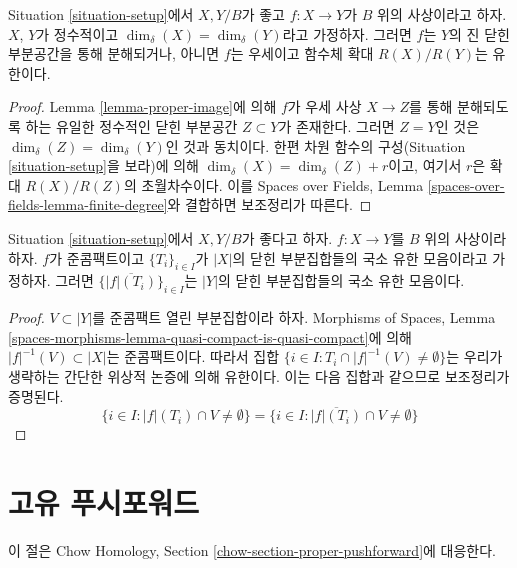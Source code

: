 \begin{lemma}
\label{lemma-equal-dimension}
Situation \ref{situation-setup}에서 $X, Y/B$가 좋고 $f : X \to Y$가
$B$ 위의 사상이라고 하자. $X$, $Y$가 정수적이고
$\dim_\delta(X) = \dim_\delta(Y)$라고 가정하자. 그러면 $f$는 $Y$의
진 닫힌 부분공간을 통해 분해되거나, 아니면 $f$는 우세이고 함수체 확대
$R(X) / R(Y)$는 유한이다.
\end{lemma}

\begin{proof}
Lemma \ref{lemma-proper-image}에 의해 $f$가 우세 사상 $X \to Z$를 통해
분해되도록 하는 유일한 정수적인 닫힌 부분공간 $Z \subset Y$가 존재한다.
그러면 $Z = Y$인 것은 $\dim_\delta(Z) = \dim_\delta(Y)$인 것과 동치이다.
한편 차원 함수의 구성(Situation \ref{situation-setup}을 보라)에 의해
$\dim_\delta(X) = \dim_\delta(Z) + r$이고, 여기서 $r$은 확대
$R(X)/R(Z)$의 초월차수이다. 이를 Spaces over Fields, Lemma
\ref{spaces-over-fields-lemma-finite-degree}와 결합하면 보조정리가 따른다.
\end{proof}

\begin{lemma}
\label{lemma-quasi-compact-locally-finite}
Situation \ref{situation-setup}에서 $X, Y/B$가 좋다고 하자.
$f : X \to Y$를 $B$ 위의 사상이라 하자. $f$가 준콤팩트이고
$\{T_i\}_{i \in I}$가 $|X|$의 닫힌 부분집합들의 국소 유한 모음이라고
가정하자. 그러면 $\{\overline{|f|(T_i)}\}_{i \in I}$는 $|Y|$의 닫힌
부분집합들의 국소 유한 모음이다.
\end{lemma}

\begin{proof}
$V \subset |Y|$를 준콤팩트 열린 부분집합이라 하자. Morphisms of Spaces,
Lemma \ref{spaces-morphisms-lemma-quasi-compact-is-quasi-compact}에 의해
$|f|^{-1}(V) \subset |X|$는 준콤팩트이다. 따라서 집합
$\{i \in I : T_i \cap |f|^{-1}(V) \not = \emptyset \}$는 우리가 생략하는
간단한 위상적 논증에 의해 유한이다. 이는 다음 집합과 같으므로 보조정리가
증명된다.
$$
\{i \in I : |f|(T_i) \cap V \not = \emptyset \} =
\{i \in I : \overline{|f|(T_i)} \cap V \not = \emptyset \}
$$
\end{proof}



\section{고유 푸시포워드}
\label{section-proper-pushforward}

\noindent
이 절은 Chow Homology, Section
\ref{chow-section-proper-pushforward}에 대응한다.

